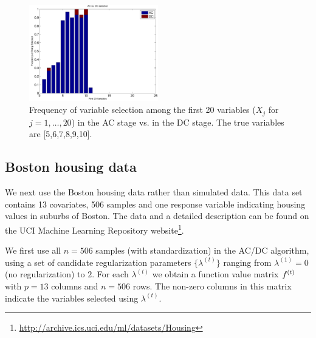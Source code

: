 \begin{figure}
\includegraphics[width=0.5\textwidth]{figs/ACvDC}
\caption{Frequency of variable selection among the first 20 variables ($X_j$ for $j=1,\ldots,20$) in the AC stage vs. in the DC stage. The true variables are [5,6,7,8,9,10].}
\label{fig:ac_v_dc}
\end{figure}


\subsection{Boston housing data}

We next use the Boston housing data rather than simulated data. This
data set contains 13 covariates, 506 samples and one response variable
indicating housing values in suburbs of Boston. The data and a
detailed description can be found on the UCI Machine Learning
Repository
website\footnote{\url{http://archive.ics.uci.edu/ml/datasets/Housing}}.

We first use all $n=506$ samples (with standardization) in the AC/DC algorithm,
using a set of candidate regularization parameters $\{\lambda^{(t)}\}$
ranging from $\lambda^{(1)} = 0$ (no regularization) to $2$. For each $\lambda^{(t)}$
we obtain a function value matrix $f^{(t)}$ with $p=13$
columns and $n=506$ rows. The non-zero columns in this matrix indicate the variables selected using $\lambda^{(t)}$.  

